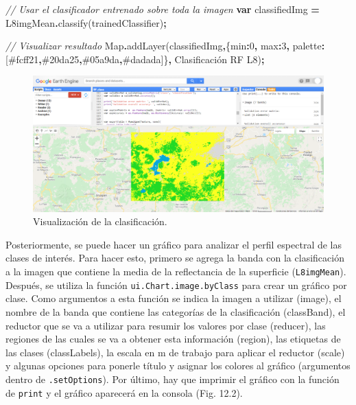 \documentclass[
  12pt,
  letterpaper,
  twoside]{book}
\newenvironment{Shaded}{\begin{snugshade}}{\end{snugshade}}
\newcommand{\BuiltInTok}[1]{#1}
\newcommand{\CommentTok}[1]{\textcolor[rgb]{0.56,0.35,0.01}{\textit{#1}}}
\newcommand{\DataTypeTok}[1]{\textcolor[rgb]{0.13,0.29,0.53}{#1}}
\newcommand{\DecValTok}[1]{\textcolor[rgb]{0.00,0.00,0.81}{#1}}
\newcommand{\FunctionTok}[1]{\textcolor[rgb]{0.00,0.00,0.00}{#1}}
\newcommand{\KeywordTok}[1]{\textcolor[rgb]{0.13,0.29,0.53}{\textbf{#1}}}
\newcommand{\NormalTok}[1]{#1}
\newcommand{\OperatorTok}[1]{\textcolor[rgb]{0.81,0.36,0.00}{\textbf{#1}}}
\newcommand{\StringTok}[1]{\textcolor[rgb]{0.31,0.60,0.02}{#1}}
\begin{document}
\begin{Shaded}
\begin{Highlighting}[]
\CommentTok{// Usar el clasificador entrenado sobre toda la imagen}
\KeywordTok{var}\NormalTok{ classifiedImg }\OperatorTok{=}\NormalTok{ L8imgMean}\OperatorTok{.}\FunctionTok{classify}\NormalTok{(trainedClassifier)}\OperatorTok{;}

\CommentTok{// Visualizar resultado}
\BuiltInTok{Map}\OperatorTok{.}\FunctionTok{addLayer}\NormalTok{(classifiedImg}\OperatorTok{,}\NormalTok{\{}\DataTypeTok{min}\OperatorTok{:}\DecValTok{0}\OperatorTok{,} \DataTypeTok{max}\OperatorTok{:}\DecValTok{3}\OperatorTok{,} 
  \DataTypeTok{palette}\OperatorTok{:}\NormalTok{[}\StringTok{\textquotesingle{}\#fcff21\textquotesingle{}}\OperatorTok{,}\StringTok{\textquotesingle{}\#20da25\textquotesingle{}}\OperatorTok{,}\StringTok{\textquotesingle{}\#05a9da\textquotesingle{}}\OperatorTok{,}\StringTok{\textquotesingle{}\#dadada\textquotesingle{}}\NormalTok{]\}}\OperatorTok{,}
  \StringTok{\textquotesingle{}Clasificación RF L8\textquotesingle{}}\NormalTok{)}\OperatorTok{;}
\end{Highlighting}
\end{Shaded}

\begin{figure}[btp]

{\centering \includegraphics[width=1\linewidth]{Img/RFClass} 

}

\caption{Visualización de la clasificación.}\label{fig:unnamed-chunk-198}
\end{figure}

Posteriormente, se puede hacer un gráfico para analizar el perfil espectral de las clases de interés. Para hacer esto, primero se agrega la banda con la clasificación a la imagen que contiene la media de la reflectancia de la superficie (\texttt{L8imgMean}). Después, se utiliza la función \texttt{ui.Chart.image.byClass} para crear un gráfico por clase. Como argumentos a esta función se indica la imagen a utilizar (image), el nombre de la banda que contiene las categorías de la clasificación (classBand), el reductor que se va a utilizar para resumir los valores por clase (reducer), las regiones de las cuales se va a obtener esta información (region), las etiquetas de las clases (classLabels), la escala en m de trabajo para aplicar el reductor (scale) y algunas opciones para ponerle título y asignar los colores al gráfico (argumentos dentro de \texttt{.setOptions}). Por último, hay que imprimir el gráfico con la función de \texttt{print} y el gráfico aparecerá en la consola (Fig. 12.2).
\end{document}

